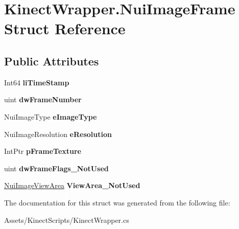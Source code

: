 \hypertarget{struct_kinect_wrapper_1_1_nui_image_frame}{}\section{Kinect\+Wrapper.\+Nui\+Image\+Frame Struct Reference}
\label{struct_kinect_wrapper_1_1_nui_image_frame}
\subsection*{Public Attributes}
\begin{DoxyCompactItemize}
\item 
\mbox{\label{struct_kinect_wrapper_1_1_nui_image_frame_a956c4365ff4f5687b2c41ff96d1b03bc}} 
Int64 {\bfseries li\+Time\+Stamp}
\item 
\mbox{\label{struct_kinect_wrapper_1_1_nui_image_frame_ad2060f260a57c7d2ffa1e46f660bc821}} 
uint {\bfseries dw\+Frame\+Number}
\item 
\mbox{\label{struct_kinect_wrapper_1_1_nui_image_frame_ada24f28ab364e7e338035897c79a2336}} 
Nui\+Image\+Type {\bfseries e\+Image\+Type}
\item 
\mbox{\label{struct_kinect_wrapper_1_1_nui_image_frame_a3b1994aae8d87c6125e866ee507c6d88}} 
Nui\+Image\+Resolution {\bfseries e\+Resolution}
\item 
\mbox{\label{struct_kinect_wrapper_1_1_nui_image_frame_ad7bb8678b184d7b4e0184036b8808771}} 
Int\+Ptr {\bfseries p\+Frame\+Texture}
\item 
\mbox{\label{struct_kinect_wrapper_1_1_nui_image_frame_a2018d64c94f2316b50d55ab5749e3e6c}} 
uint {\bfseries dw\+Frame\+Flags\+\_\+\+Not\+Used}
\item 
\mbox{\label{struct_kinect_wrapper_1_1_nui_image_frame_a466d3e02ff63647b70017313652a0fb8}} 
\mbox{\hyperlink{struct_kinect_wrapper_1_1_nui_image_view_area}{Nui\+Image\+View\+Area}} {\bfseries View\+Area\+\_\+\+Not\+Used}
\end{DoxyCompactItemize}


The documentation for this struct was generated from the following file\+:\begin{DoxyCompactItemize}
\item 
Assets/\+Kinect\+Scripts/Kinect\+Wrapper.\+cs\end{DoxyCompactItemize}
